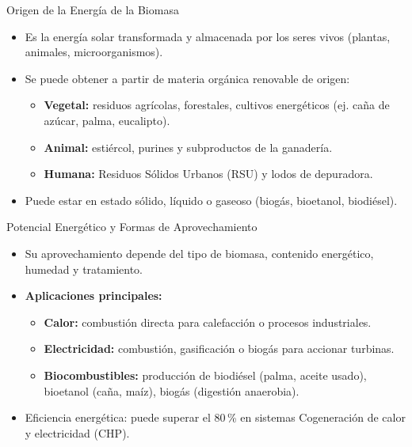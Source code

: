 \documentclass[main.tex]{subfiles}
\begin{document}
\begin{frame}{Origen de la Energía de la Biomasa}
    \begin{itemize}
        \item Es la energía solar transformada y almacenada por los seres vivos (plantas, animales, microorganismos).
        \item Se puede obtener a partir de materia orgánica renovable de origen:
        \begin{itemize}
            \item \textbf{Vegetal:} residuos agrícolas, forestales, cultivos energéticos (ej. caña de azúcar, palma, eucalipto).
            \item \textbf{Animal:} estiércol, purines y subproductos de la ganadería.
            \item \textbf{Humana:} Residuos Sólidos Urbanos (RSU) y lodos de depuradora.
        \end{itemize}
        \item Puede estar en estado sólido, líquido o gaseoso (biogás, bioetanol, biodiésel).
    \end{itemize}
\end{frame}

\begin{frame}{Potencial Energético y Formas de Aprovechamiento}
    \begin{itemize}
        \item Su aprovechamiento depende del tipo de biomasa, contenido energético, humedad y tratamiento.
        \item \textbf{Aplicaciones principales:}
        \begin{itemize}
            \item \textbf{Calor:} combustión directa para calefacción o procesos industriales.
            \item \textbf{Electricidad:} combustión, gasificación o biogás para accionar turbinas.
            \item \textbf{Biocombustibles:} producción de biodiésel (palma, aceite usado), bioetanol (caña, maíz), biogás (digestión anaerobia).
        \end{itemize}
        \item Eficiencia energética: puede superar el 80\,\% en sistemas Cogeneración de calor y electricidad (CHP).
    \end{itemize}
\end{frame}
\end{document}
